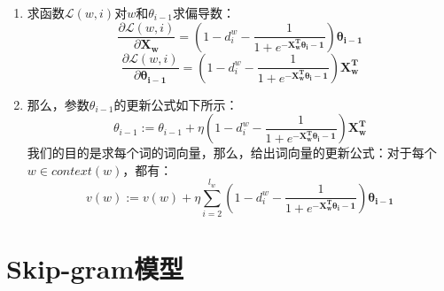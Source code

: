 \begin{enumerate}
        \item 求函数$\mathcal{L}(w, i)$对$w$和$\theta_{i-1}$求偏导数：
        \begin{equation}
            \frac{\partial \mathcal{L}(w, i)}{\partial \boldsymbol{X_w}} = (1-d_i^w-\frac{1}{1+e^{\boldsymbol{-X_w^T\theta_i-1}}})\boldsymbol{\theta_{i-1}}
        \end{equation}
        \begin{equation}
            \frac{\partial \mathcal{L}(w, i)}{\partial \boldsymbol{\theta_{i-1}}} = (1-d_i^w-\frac{1}{1+e^{\boldsymbol{-X_w^T\theta_i-1}}})\boldsymbol{X_w^T}
        \end{equation}

        \item 那么，参数$\theta_{i-1}$的更新公式如下所示：
        \begin{equation}
            \theta_{i-1} := \theta_{i-1} + \eta (1-d_i^w-\frac{1}{1+e^{\boldsymbol{-X_w^T\theta_i-1}}})\boldsymbol{X_w^T}
        \end{equation}
        我们的目的是求每个词的词向量，那么，给出词向量的更新公式：对于每个$w \in context(w)$，都有：
        \begin{equation}
            v(w):=v(w)+\eta \sum_{i=2}^{l_w}(1-d_i^w-\frac{1}{1+e^{\boldsymbol{-X_w^T\theta_i-1}}})\boldsymbol{\theta_{i-1}}
        \end{equation}
    \end{enumerate}

    \section{Skip-gram模型}
